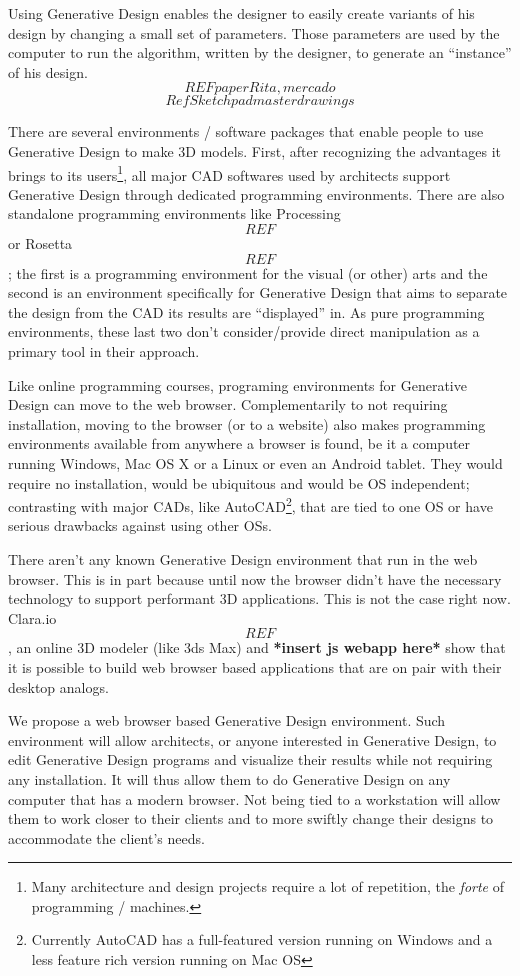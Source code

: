 \documentclass{./llncs2e/llncs}
\begin{document}
Using Generative Design enables the designer to easily create variants of his design by changing a small set of parameters. Those parameters are used by the computer to run the algorithm, written by the designer, to generate an ``instance'' of his design. \[REF paper Rita, mercado\] \[Ref Sketchpad master drawings\]

There are several environments / software packages that enable people to use Generative Design to make 3D models. First, after recognizing the advantages it brings to its users\footnote{Many architecture and design projects require a lot of repetition, the \emph{forte} of programming / machines.}, all major CAD softwares used by architects support Generative Design through dedicated programming environments. There are also standalone programming environments like Processing\[REF\] or Rosetta\[REF\]; the first is a programming environment for the visual (or other) arts and the second is an environment specifically for Generative Design that aims to separate the design from the CAD its results are ``displayed'' in. As pure programming environments, these last two don't consider/provide direct manipulation as a primary tool in their approach.

Like online programming courses, programing environments for Generative Design can move to the web browser. Complementarily to not requiring installation, moving to the browser (or to a website) also makes programming environments available from anywhere a browser is found, be it a computer running Windows, Mac OS X or a Linux or even an Android tablet. They would require no installation, would be ubiquitous and would be OS independent; contrasting with major CADs, like AutoCAD\footnote{Currently AutoCAD has a full-featured version running on Windows and a less feature rich version running on Mac OS}, that are tied to one OS or have serious drawbacks against using other OSs.

There aren't any known Generative Design environment that run in the web browser. This is in part because until now the browser didn't have the necessary technology to support performant 3D applications. This is not the case right now. Clara.io\[REF\], an online 3D modeler (like 3ds Max) and \textbf{*insert js webapp here*} show that it is possible to build web browser based applications that are on pair with their desktop analogs.

We propose a web browser based Generative Design environment. Such environment will allow architects, or anyone interested in Generative Design, to edit Generative Design programs and visualize their results while not requiring any installation. It will thus allow them to do Generative Design on any computer that has a modern browser. Not being tied to a workstation will allow them to work closer to their clients and to more swiftly change their designs to accommodate the client's needs.
\end{document}
